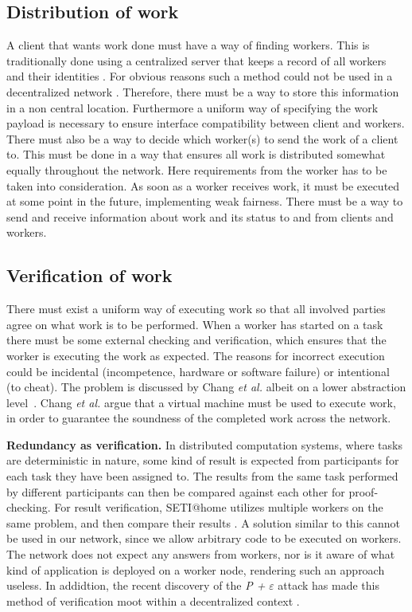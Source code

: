 \subsection{Distribution of work}
A client that wants work done must have a way of finding workers. This is traditionally done using a centralized server that keeps a record of all workers and their identities \cite{anderson:2005}\cite{sarmenta:2002}. For obvious reasons such a method could not be used in a decentralized network \cite{baran}. Therefore, there must be a way to store this information in a non central location. Furthermore a uniform way of specifying the work payload is necessary to ensure interface compatibility between client and workers. There must also be a way to decide which worker(s) to send the work of a client to. This must be done in a way that ensures all work is distributed somewhat equally throughout the network. Here requirements from the worker has to be taken into consideration. As soon as a worker receives work, it must be executed at some point in the future, implementing weak fairness. There must be a way to send and receive information about work and its status to and from clients and workers.

\subsection{Verification of work}
There must exist a uniform way of executing work so that all involved parties agree on what work is to be performed. When a worker has started on a task there must be some external checking and verification, which ensures that the worker is executing the work as expected. The reasons for incorrect execution could be incidental (incompetence, hardware or software failure) or intentional (to cheat). The problem is discussed by Chang \textit{et al.} albeit on a lower abstraction level~\cite{chang:2002}. Chang \textit{et al.} argue that a virtual machine must be used to execute work, in order to guarantee the soundness of the completed work across the network.

\textbf{Redundancy as verification.} In distributed computation systems, where tasks are deterministic in nature, some kind of result is expected from participants for each task they have been assigned to. The results from the same task performed by different participants can then be compared against each other for proof-checking. For result verification, SETI@home utilizes multiple workers on the same problem, and then compare their results \cite{korpela:2001}. A solution similar to this cannot be used in our network, since we allow arbitrary code to be executed on workers. The network does not expect any answers from workers, nor is it aware of what kind of application is deployed on a worker node, rendering such an approach useless. In addidtion, the recent discovery of the \emph{P +} $\varepsilon$ attack has made this method of verification moot within a decentralized context \cite{buterin:2015}.

